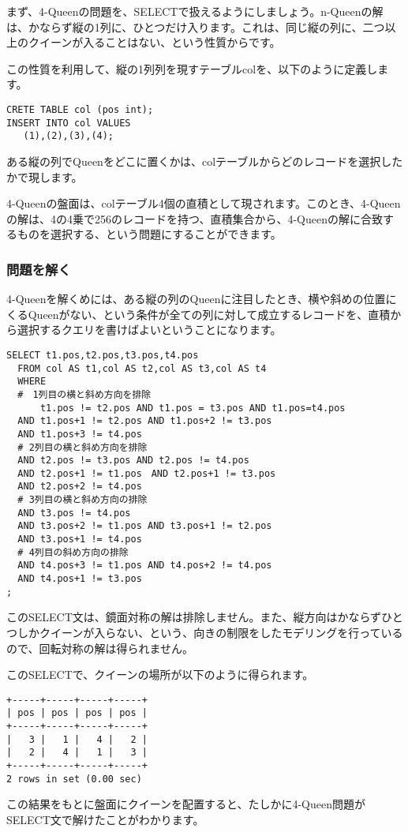 まず、4-Queenの問題を、SELECTで扱えるようにしましょう。n-Queenの解は、かならず縦の1列に、ひとつだけ入ります。これは、同じ縦の列に、二つ以上のクイーンが入ることはない、という性質からです。

この性質を利用して、縦の1列列を現すテーブルcolを、以下のように定義します。

\begin{verbatim}
CRETE TABLE col (pos int);
INSERT INTO col VALUES
   (1),(2),(3),(4);
\end{verbatim}

ある縦の列でQueenをどこに置くかは、colテーブルからどのレコードを選択したかで現します。

4-Queenの盤面は、colテーブル4個の直積として現されます。このとき、4-Queenの解は、4の4乗で256のレコードを持つ、直積集合から、4-Queenの解に合致するものを選択する、という問題にすることができます。

\subsubsection{問題を解く}

4-Queenを解くめには、ある縦の列のQueenに注目したとき、横や斜めの位置にくるQueenがない、という条件が全ての列に対して成立するレコードを、直積から選択するクエリを書けばよいということになります。

\begin{verbatim}
SELECT t1.pos,t2.pos,t3.pos,t4.pos
  FROM col AS t1,col AS t2,col AS t3,col AS t4
  WHERE 
  #　1列目の横と斜め方向を排除
      t1.pos != t2.pos AND t1.pos = t3.pos AND t1.pos=t4.pos
  AND t1.pos+1 != t2.pos AND t1.pos+2 != t3.pos 
  AND t1.pos+3 != t4.pos
  # 2列目の横と斜め方向を排除
  AND t2.pos != t3.pos AND t2.pos != t4.pos
  AND t2.pos+1 != t1.pos　AND t2.pos+1 != t3.pos
  AND t2.pos+2 != t4.pos
  # 3列目の横と斜め方向の排除
  AND t3.pos != t4.pos
  AND t3.pos+2 != t1.pos AND t3.pos+1 != t2.pos
  AND t3.pos+1 != t4.pos
  # 4列目の斜め方向の排除
  AND t4.pos+3 != t1.pos AND t4.pos+2 != t4.pos
  AND t4.pos+1 != t3.pos
;
\end{verbatim}

このSELECT文は、鏡面対称の解は排除しません。また、縦方向はかならずひとつしかクイーンが入らない、という、向きの制限をしたモデリングを行っているので、回転対称の解は得られません。

このSELECTで、クイーンの場所が以下のように得られます。

\begin{verbatim}
+-----+-----+-----+-----+
| pos | pos | pos | pos |
+-----+-----+-----+-----+
|   3 |   1 |   4 |   2 | 
|   2 |   4 |   1 |   3 |
+-----+-----+-----+-----+
2 rows in set (0.00 sec)
\end{verbatim}

この結果をもとに盤面にクイーンを配置すると、たしかに4-Queen問題がSELECT文で解けたことがわかります。




